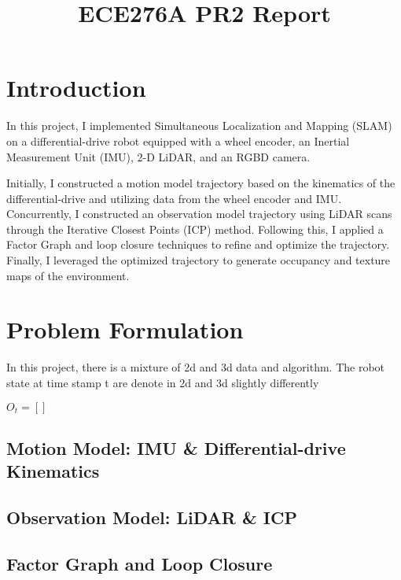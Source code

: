 \documentclass[conference]{IEEEtran}
\begin{document}
\title{ECE276A PR2 Report}

\author{
}

\maketitle


\section{Introduction}
In this project, I implemented Simultaneous Localization and Mapping (SLAM) 
on a differential-drive robot 
equipped with a wheel encoder, an Inertial Measurement Unit (IMU), 
2-D LiDAR, and an RGBD camera.

Initially, I constructed a motion model trajectory 
based on the kinematics of the differential-drive and 
utilizing data from the wheel encoder and IMU. 
Concurrently, I constructed an observation model trajectory 
using LiDAR scans through the Iterative Closest Points (ICP) method. 
Following this, I applied a Factor Graph and loop closure techniques to 
refine and optimize the trajectory. 
Finally, I leveraged the optimized trajectory to 
generate occupancy and texture maps of the environment.

\section{Problem Formulation}

In this project, there is a mixture of 2d and 3d data and algorithm. 
The robot state at time stamp t are denote in 2d and 3d slightly differently

$O_t = \left[ \right]$

\subsection{Motion Model: IMU \& Differential-drive Kinematics}


\subsection{Observation Model: LiDAR \& ICP}

\subsection{Factor Graph and Loop Closure}
\end{document}
